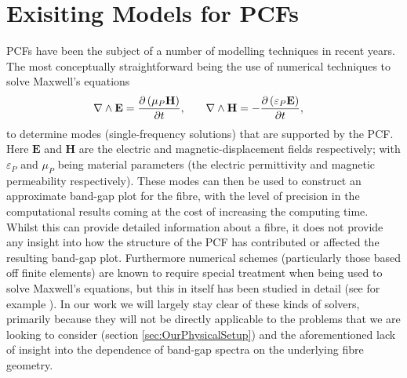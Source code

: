 \section{Exisiting Models for PCFs} \label{sec:ExistingPCFModels}
PCFs have been the subject of a number of modelling techniques in recent years. 
The most conceptually straightforward being the use of numerical techniques to solve Maxwell's equations
\begin{align*}
	\nabla\wedge\mathbf{E} &= \dfrac{\partial \left( \mu_{P}\mathbf{H} \right)}{\partial t}, 
	&\quad \nabla\wedge\mathbf{H} &= -\dfrac{\partial \left( \varepsilon_{P}\mathbf{E} \right)}{\partial t},	
\end{align*} 
to determine modes (single-frequency solutions) that are supported by the PCF.
Here $\mathbf{E}$ and $\mathbf{H}$ are the electric and magnetic-displacement fields respectively; with $\varepsilon_{P}$ and $\mu_{P}$ being material parameters (the electric permittivity and magnetic permeability respectively).
These modes can then be used to construct an approximate band-gap plot for the fibre, with the level of precision in the computational results coming at the cost of increasing the computing time.
Whilst this can provide detailed information about a fibre, it does not provide any insight into how the structure of the PCF has contributed or affected the resulting band-gap plot.
Furthermore numerical schemes (particularly those based off finite elements) are known to require special treatment when being used to solve Maxwell's equations, but this in itself has been studied in detail (see for example \cite{monk2003finite}).
In our work we will largely stay clear of these kinds of solvers, primarily because they will not be directly applicable to the problems that we are looking to consider (section \ref{sec:OurPhysicalSetup}) and the aforementioned lack of insight into the dependence of band-gap spectra on the underlying fibre geometry. \newline

